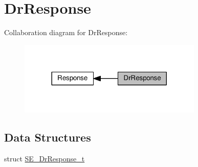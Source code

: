 \hypertarget{group__DrResponse}{}\section{Dr\+Response}
\label{group__DrResponse}
Collaboration diagram for Dr\+Response\+:\nopagebreak
\begin{figure}[H]
\begin{center}
\leavevmode
\includegraphics[width=248pt]{group__DrResponse}
\end{center}
\end{figure}
\subsection*{Data Structures}
\begin{DoxyCompactItemize}
\item 
struct \hyperlink{structSE__DrResponse__t}{S\+E\+\_\+\+Dr\+Response\+\_\+t}
\end{DoxyCompactItemize}
